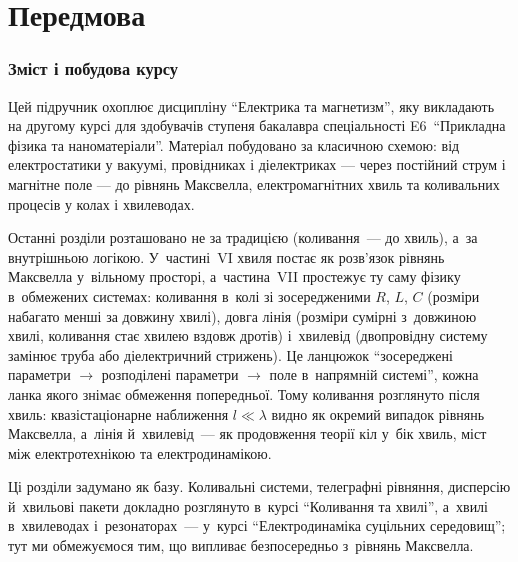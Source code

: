 
\chapter*{Передмова}\label{\currfilebase}\hypertarget{\currfilebase}{}

\subsection*{Зміст і побудова курсу}

Цей підручник охоплює дисципліну \enquote{Електрика та магнетизм}, яку викладають на
другому курсі для здобувачів ступеня бакалавра спеціальності E6~\enquote{Прикладна фізика
та наноматеріали}. Матеріал побудовано за класичною схемою: від електростатики у вакуумі,
провідниках і діелектриках --- через постійний струм і магнітне поле --- до рівнянь
Максвелла, електромагнітних хвиль та коливальних процесів у колах і хвилеводах.

Останні розділи розташовано не за традицією (коливання~--- до хвиль), а~за внутрішньою
логікою. У~частині~VI хвиля постає як розв'язок рівнянь Максвелла у~вільному просторі,
а~частина~VII простежує ту саму фізику в~обмежених системах: коливання в~колі зі
зосередженими $R$, $L$, $C$ (розміри набагато менші за довжину хвилі), довга лінія
(розміри сумірні з~довжиною хвилі, коливання стає хвилею вздовж дротів) і~хвилевід
(двопровідну систему замінює труба або діелектричний стрижень). Це ланцюжок
\enquote{зосереджені параметри $\to$ розподілені параметри $\to$ поле в~напрямній
системі}, кожна ланка якого знімає обмеження попередньої. Тому коливання розглянуто після
хвиль: квазістаціонарне наближення $l\ll\lambda$ видно як окремий випадок рівнянь
Максвелла, а~лінія й~хвилевід~--- як продовження теорії кіл у~бік хвиль, міст між
електротехнікою та електродинамікою.

Ці розділи задумано як базу. Коливальні системи, телеграфні рівняння, дисперсію й~хвильові
пакети докладно розглянуто в~курсі \enquote{Коливання та хвилі}, а~хвилі в~хвилеводах
і~резонаторах~--- у~курсі \enquote{Електродинаміка суцільних середовищ}; тут ми
обмежуємося тим, що випливає безпосередньо з~рівнянь Максвелла.

